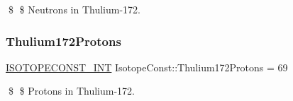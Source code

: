 \$ \$ Neutrons in Thulium-\/172. \mbox{\label{group___isotope_const-_thulium-_tm172_ga11236858d6d451ecfa4610dfddbfc895}} 
\subsubsection{\texorpdfstring{Thulium172\+Protons}{Thulium172Protons}}
{\footnotesize\ttfamily \mbox{\hyperlink{group___isotope_const-_macros_ga5f18360b3e99483a35c32d789e62621c}{I\+S\+O\+T\+O\+P\+E\+C\+O\+N\+S\+T\+\_\+\+I\+NT}} Isotope\+Const\+::\+Thulium172\+Protons = 69}

\$ \$ Protons in Thulium-\/172. 